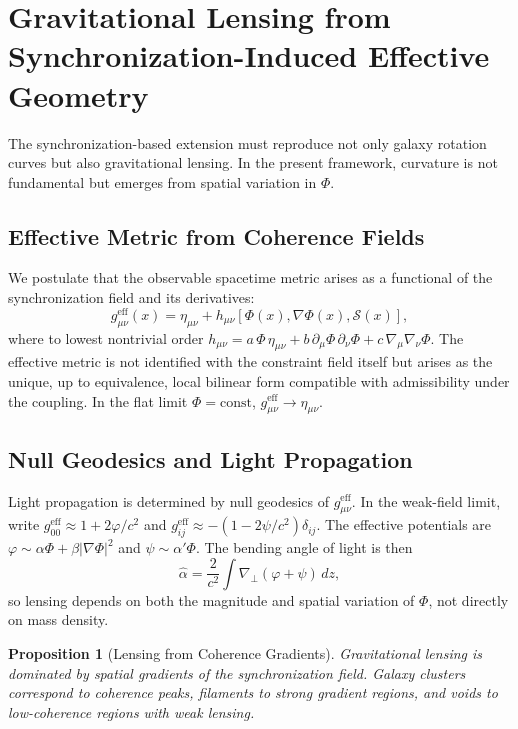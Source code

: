 \documentclass[11pt, a4paper, twocolumn]{article}
\newtheorem{proposition}[definition]{Proposition}
\newcommand{\Sfield}{\mathcal{S}}
\begin{document}
\section{Gravitational Lensing from Synchronization-Induced Effective Geometry}

The synchronization-based extension must reproduce not only galaxy rotation
curves but also gravitational lensing. In the present framework, curvature is
not fundamental but emerges from spatial variation in $\Phi$.

\subsection{Effective Metric from Coherence Fields}

We postulate that the observable spacetime metric arises as a functional of the
synchronization field and its derivatives:
\[
g_{\mu\nu}^{\mathrm{eff}}(x)
=
\eta_{\mu\nu}
+
h_{\mu\nu}[\Phi(x),\nabla\Phi(x),\Sfield(x)],
\]
where to lowest nontrivial order
$h_{\mu\nu} = a\,\Phi\,\eta_{\mu\nu} + b\,\partial_\mu\Phi\,\partial_\nu\Phi
+ c\,\nabla_\mu\nabla_\nu\Phi$. The effective metric is not identified with
the constraint field itself but arises as the unique, up to equivalence, local
bilinear form compatible with admissibility under the coupling. In the flat
limit $\Phi = \mathrm{const}$, $g_{\mu\nu}^{\mathrm{eff}} \to \eta_{\mu\nu}$.

\subsection{Null Geodesics and Light Propagation}

Light propagation is determined by null geodesics of $g_{\mu\nu}^{\mathrm{eff}}$.
In the weak-field limit, write $g_{00}^{\mathrm{eff}} \approx 1 + 2\varphi/c^2$
and $g_{ij}^{\mathrm{eff}} \approx -(1-2\psi/c^2)\delta_{ij}$. The effective
potentials are $\varphi \sim \alpha\Phi + \beta|\nabla\Phi|^2$ and
$\psi \sim \alpha'\Phi$. The bending angle of light is then
\[
\hat{\alpha}
=
\frac{2}{c^2}
\int \nabla_\perp(\varphi+\psi)\,dz,
\]
so lensing depends on both the magnitude and spatial variation of $\Phi$, not
directly on mass density.

\begin{proposition}[Lensing from Coherence Gradients]
Gravitational lensing is dominated by spatial gradients of the synchronization
field. Galaxy clusters correspond to coherence peaks, filaments to strong
gradient regions, and voids to low-coherence regions with weak lensing.
\end{proposition}
\end{document}
